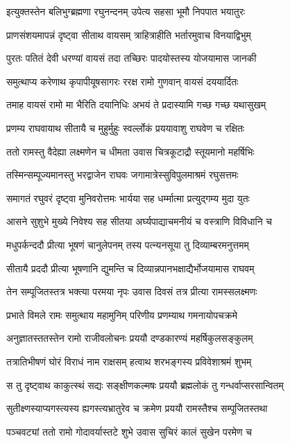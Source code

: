 \twolineshloka
{इत्युक्तस्तेन बलिभुग्ब्रह्मणा रघुनन्दनम्}
{उपेत्य सहसा भूमौ निपपात भयातुरः}%

\twolineshloka
{प्राणसंशयमापन्नं दृष्ट्वा सीताथ वायसम्}
{त्राहित्राहीति भर्तारमुवाच विनयाद्विभुम्}%

\twolineshloka
{पुरतः पतितं देवी धरण्यां वायसं तदा}
{तच्छिरः पादयोस्तस्य योजयामास जानकी}%

\twolineshloka
{समुत्थाप्य करेणाथ कृपापीयूषसागरः}
{ररक्ष रामो गुणवान् वायसं दययार्दितः}%

\twolineshloka
{तमाह वायसं रामो मा भैरिति दयानिधिः}
{अभयं ते प्रदास्यामि गच्छ गच्छ यथासुखम्}%

\twolineshloka
{प्रणम्य राघवायाथ सीतायै च मुहुर्मुहुः}
{स्वर्ल्लोकं प्रययावाशु राघवेण च रक्षितः}%

\twolineshloka
{ततो रामस्तु वैदेह्या लक्ष्मणेन च धीमता}
{उवास चित्रकूटाद्रौ स्तूयमानो महर्षिभिः}%

\twolineshloka
{तस्मिन्सम्पूज्यमानस्तु भरद्वाजेन राघवः}
{जगामात्रेस्सुविपुलमाश्रमं रघुसत्तमः}%

\twolineshloka
{समागतं रघुवरं दृष्ट्वा मुनिवरोत्तमः}
{भार्यया सह धर्म्मात्मा प्रत्युद्गम्य मुदा युतः}%

\twolineshloka
{आसने सुशुभे मुख्ये निवेश्य सह सीतया}
{अर्घ्यपाद्याचमनीयं च वस्त्राणि विविधानि च}%

\twolineshloka
{मधुपर्कन्ददौ प्रीत्या भूषणं चानुलेपनम्}
{तस्य पत्न्यनसूया तु दिव्याम्बरमनुत्तमम्}%

\twolineshloka
{सीतायै प्रददौ प्रीत्या भूषणानि द्युमन्ति च}
{दिव्यान्नपानभक्षाद्यैर्भोजयामास राघवम्}%

\twolineshloka
{तेन सम्पूजितस्तत्र भक्त्या परमया नृपः}
{उवास दिवसं तत्र प्रीत्या रामस्सलक्ष्मणः}%

\twolineshloka
{प्रभाते विमले रामः समुत्थाय महामुनिम्}
{परिणीय प्रणम्याथ गमनायोपचक्रमे}%

\twolineshloka
{अनुज्ञातस्ततस्तेन रामो राजीवलोचनः}
{प्रययौ दण्डकारण्यं महर्षिकुलसङ्कुलम्}%

\twolineshloka
{तत्रातिभीषणं घोरं विराधं नाम राक्षसम्}
{हत्वाथ शरभङ्गस्य प्रविवेशाश्रमं शुभम्}%

\twolineshloka
{स तु दृष्ट्वाथ काकुत्स्थं सद्यः सङ्क्षीणकल्मषः}
{प्रययौ ब्रह्मलोकं तु गन्धर्वाप्सरसान्वितम्}%

\twolineshloka
{सुतीक्ष्णस्याप्यगस्त्यस्य ह्यगस्त्यभ्रातुरेव च}
{क्रमेण प्रययौ रामस्तैश्च सम्पूजितस्तथा}%

\twolineshloka
{पञ्चवट्यां ततो रामो गोदावर्यास्तटे शुभे}
{उवास सुचिरं कालं सुखेन परमेण च}%

